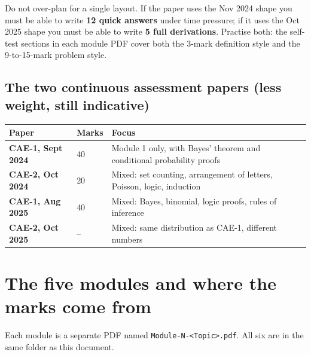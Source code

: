 \documentclass[11pt,a4paper]{article}
\begin{document}
\begin{dangerbox}
Do not over-plan for a single layout. If the paper uses the Nov 2024 shape you must be able to write \textbf{12 quick answers} under time pressure; if it uses the Oct 2025 shape you must be able to write \textbf{5 full derivations}. Practise both: the self-test sections in each module PDF cover both the 3-mark definition style and the 9-to-15-mark problem style.
\end{dangerbox}

\subsection{The two continuous assessment papers (less weight, still indicative)}

\begin{center}\small
\begin{tabularx}{\textwidth}{>{\bfseries}p{} p{} X}
\toprule Paper & Marks & Focus\\\midrule
CAE-1, Sept 2024 & 40 & Module 1 only, with Bayes' theorem and conditional probability proofs\\
CAE-2, Oct 2024 & 20 & Mixed: set counting, arrangement of letters, Poisson, logic, induction\\
CAE-1, Aug 2025 & 40 & Mixed: Bayes, binomial, logic proofs, rules of inference\\
CAE-2, Oct 2025 & -- & Mixed: same distribution as CAE-1, different numbers\\\bottomrule
\end{tabularx}
\end{center}

\section{The five modules and where the marks come from}

Each module is a separate PDF named \texttt{Module-N-<Topic>.pdf}. All six are in the same folder as this document.
\end{document}
